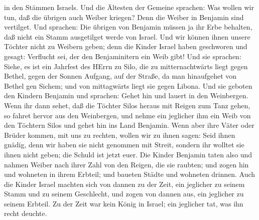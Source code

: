 in den Stämmen Israels.  Und die Ältesten der Gemeine
sprachen: Was wollen wir tun, daß die übrigen auch Weiber kriegen? Denn
die Weiber in Benjamin sind vertilget.  Und sprachen: Die
übrigen von Benjamin müssen ja ihr Erbe behalten, daß nicht ein Stamm
ausgetilget werde von Israel.  Und wir können ihnen unsere
Töchter nicht zu Weibern geben; denn die Kinder Israel haben geschworen
und gesagt: Verflucht sei, der den Benjaminitern ein Weib gibt!
 Und sie sprachen: Siehe, es ist ein Jahrfest des HErrn zu
Silo, die zu mitternachtwärts liegt gegen Bethel, gegen der Sonnen
Aufgang, auf der Straße, da man hinaufgehet von Bethel gen Sichem; und
von mittagwärts liegt sie gegen Libona.  Und sie geboten
den Kindern Benjamin und sprachen: Gehet hin und lauert in den
Weinbergen.  Wenn ihr dann sehet, daß die Töchter Silos
heraus mit Reigen zum Tanz gehen, so fahret hervor aus den Weinbergen,
und nehme ein jeglicher ihm ein Weib von den Töchtern Silos und gehet
hin ins Land Benjamin.  Wenn aber ihre Väter oder Brüder
kommen, mit uns zu rechten, wollen wir zu ihnen sagen: Seid ihnen
gnädig, denn wir haben sie nicht genommen mit Streit, sondern ihr
wolltet sie ihnen nicht geben; die Schuld ist jetzt euer. 
Die Kinder Benjamin taten also und nahmen Weiber nach ihrer Zahl von den
Reigen, die sie raubten; und zogen hin und wohneten in ihrem Erbteil;
und baueten Städte und wohneten drinnen.  Auch die Kinder
Israel machten sich von dannen zu der Zeit, ein jeglicher zu seinem
Stamm und zu seinem Geschlecht, und zogen von dannen aus, ein jeglicher
zu seinem Erbteil.  Zu der Zeit war kein König in Israel;
ein jeglicher tat, was ihn recht deuchte.

